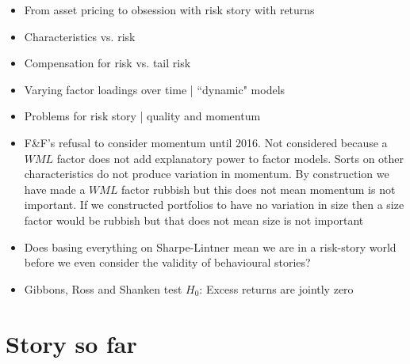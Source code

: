 \begin{itemize}
  \item From asset pricing to obsession with risk story with returns
  \item Characteristics vs. risk
  \item Compensation for risk vs. tail risk
  \item Varying factor loadings over time | ``dynamic" models
  \item Problems for risk story | quality and momentum
  \item F\&F's refusal to consider momentum until 2016. Not considered because a $WML$ 
  factor does not add explanatory power to factor models. Sorts on other characteristics
  do not produce variation in momentum. By construction we have made a $WML$ factor
  rubbish but this does not mean momentum is not important. If we constructed portfolios
  to have no variation in size then a size factor would be rubbish but that does not mean
  size is not important
  \item Does basing everything on Sharpe-Lintner mean we are in a risk-story world before
  we even consider the validity of behavioural stories?
  \item Gibbons, Ross and Shanken test $H_0$: Excess returns are jointly zero

\end{itemize}

\section{Story so far}

